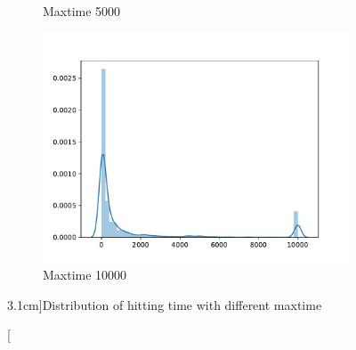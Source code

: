 \documentclass{homework}
\begin{document}
\begin{subproblem}[\roman*)]
\begin{figure}[h]
\begin{subfigure}[b]{0.3\textwidth}
                \caption{Maxtime 5000}
            \end{subfigure}
            \begin{subfigure}[b]{0.3\textwidth}
                \includegraphics[width=\textwidth]{max=10000}
                \caption{Maxtime 10000}
            \end{subfigure}
            \caption[][3.1cm]{Distribution of hitting time with different maxtime}
            \label{fig:dist}
        \end{figure}
    \end{subproblem}
\end{document}
